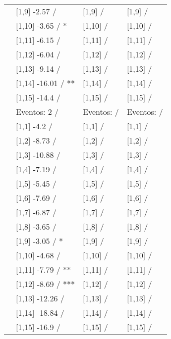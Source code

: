 \begin{table}
\begin{tabular}[t]{llll}
\addlinespace
 & {}[1,9] -2.57  / & {}[1,9]  / & {}[1,9]  /\\
 & {}[1,10] -3.65  / * & {}[1,10]  / & {}[1,10]  /\\
 & {}[1,11] -6.15  / & {}[1,11]  / & {}[1,11]  /\\
 & {}[1,12] -6.04  / & {}[1,12]  / & {}[1,12]  /\\
 & {}[1,13] -9.14  / & {}[1,13]  / & {}[1,13]  /\\
\addlinespace
 & {}[1,14] -16.01  / ** & {}[1,14]  / & {}[1,14]  /\\
 & {}[1,15] -14.4  / & {}[1,15]  / & {}[1,15]  /\\
 & Eventos:  2 / & Eventos:   / & Eventos:   /\\
 & {}[1,1] -4.2  / & {}[1,1]  / & {}[1,1]  /\\
 & {}[1,2] -8.73  / & {}[1,2]  / & {}[1,2]  /\\
\addlinespace
 & {}[1,3] -10.88  / & {}[1,3]  / & {}[1,3]  /\\
 & {}[1,4] -7.19  / & {}[1,4]  / & {}[1,4]  /\\
 & {}[1,5] -5.45  / & {}[1,5]  / & {}[1,5]  /\\
 & {}[1,6] -7.69  / & {}[1,6]  / & {}[1,6]  /\\
 & {}[1,7] -6.87  / & {}[1,7]  / & {}[1,7]  /\\
\addlinespace
500 & {}[1,8] -3.65  / & {}[1,8]  / & {}[1,8]  /\\
 & {}[1,9] -3.05  / * & {}[1,9]  / & {}[1,9]  /\\
 & {}[1,10] -4.68  / & {}[1,10]  / & {}[1,10]  /\\
 & {}[1,11] -7.79  / ** & {}[1,11]  / & {}[1,11]  /\\
 & {}[1,12] -8.69  / *** & {}[1,12]  / & {}[1,12]  /\\
\addlinespace
 & {}[1,13] -12.26  / & {}[1,13]  / & {}[1,13]  /\\
 & {}[1,14] -18.84  / & {}[1,14]  / & {}[1,14]  /\\
 & {}[1,15] -16.9  / & {}[1,15]  / & {}[1,15]  /\\
\bottomrule
\end{tabular}
\end{table}
